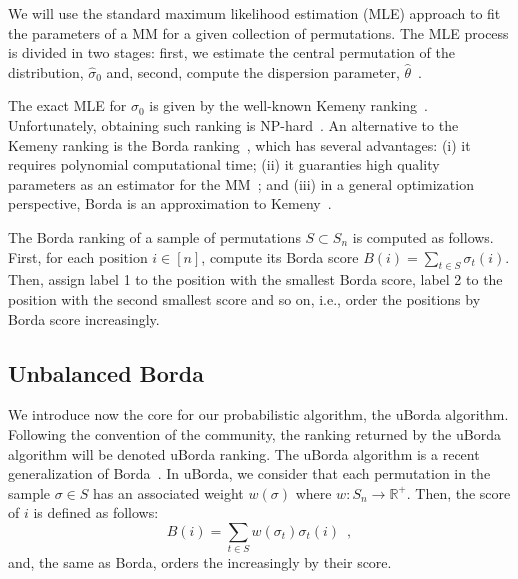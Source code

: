 \documentclass[runningheads]{llncs}
\begin{document}
We will use the standard maximum likelihood estimation (MLE) approach to fit the parameters of a MM for a given collection of permutations. 
The MLE process is divided in two stages: first, we estimate the central permutation of the distribution, $\hat{\sigma}_0$ and, second, compute the dispersion parameter, $\hat\theta$~\cite{IruCalLoz2016permallows}. 

The exact MLE for $\sigma_0$ is given by the well-known Kemeny ranking~\cite{DwoKumNao2001rank}. Unfortunately,  obtaining such ranking is NP-hard~\cite{DwoKumNao2001rank}. An alternative to the Kemeny ranking is the Borda ranking~\cite{AliMei2011kemeny}, which has several advantages: (i) it requires polynomial computational time; (ii) it  guaranties  high quality parameters as an estimator for the MM~\cite{CarProSha2013votes}; and (iii) in a general optimization perspective, Borda is an approximation to Kemeny~\cite{CopFleRur2010ordering}.

The Borda ranking of a sample of permutations $S \subset S_n$ is computed as follows. 
First, for each position $i \in [n]$, compute its Borda score $B(i) =  \sum_{t\in S}  \sigma_t(i)$. Then, assign label 1 to the position with the smallest Borda score, label 2 to the position with the second smallest score and so on, i.e., order the positions by Borda score increasingly.

\subsection{Unbalanced Borda}\label{sec:uborda}
We introduce now the core for our probabilistic algorithm, the uBorda algorithm. Following the convention of the community, the ranking returned by the uBorda algorithm will be denoted uBorda ranking. The uBorda algorithm is a recent generalization of Borda~\cite{???}. In uBorda, we consider that each permutation in the sample $\sigma\in S$ has an associated weight $w(\sigma)$ where $w\colon S_n \to \mathbb{R^{+}}$. Then, the score of  $i$ is defined as follows:
%
\begin{equation}\label{eq:uborda_score}
B(i) =  \sum_{t\in S}  w(\sigma_t) \sigma_t(i) \enspace,
\end{equation}
%
and, the same as Borda, orders the  increasingly by their score.
\end{document}
